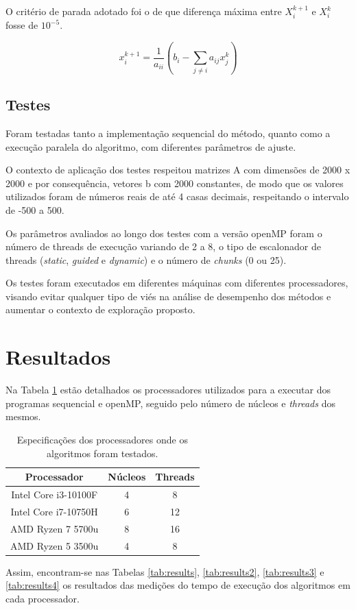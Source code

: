 \documentclass{article}
\begin{document}
O critério de parada adotado foi o de que diferença máxima entre $X_{i}^{k+1}$ e $X_{i}^{k}$ fosse de $10^{-5}$.

\begin{equation}
\label{eq:jacobi}
    x_{i}^{k+1} = \frac{1}{a_{ii}}\left(b_i - \sum_{j \neq i} a_{ij}x_{j}^{k}\right)
\end{equation}

\subsection{Testes}


Foram testadas tanto a implementação sequencial do método, quanto como a execução paralela do algoritmo, com diferentes parâmetros de ajuste. 

O contexto de aplicação dos testes respeitou matrizes A com dimensões de 2000 x 2000 e por consequência, vetores b com 2000 constantes, de modo que os valores utilizados foram de números reais de até 4 casas decimais, respeitando o intervalo de -500 a 500. 

Os parâmetros avaliados ao longo dos testes com a versão openMP foram o número de threads de execução variando de 2 a 8, o tipo de escalonador de threads (\textit{static}, \textit{guided} e \textit{dynamic})  e o número de \textit{chunks} (0 ou 25).  

Os testes foram executados em diferentes máquinas com diferentes processadores, visando evitar qualquer tipo de viés na análise de desempenho dos métodos e aumentar o contexto de exploração proposto. 


\section{Resultados}
Na Tabela \ref{tab:processor_specs} estão detalhados os processadores utilizados para a executar dos programas sequencial e openMP, seguido pelo número de núcleos e \textit{threads} dos mesmos.


\begin{table}[h]
    \centering
    \caption{Especificações dos processadores onde os algoritmos foram testados.}
    \label{tab:processor_specs}
    \begin{tabular}{ccc}
    \toprule
    \textbf{Processador} & \textbf{Núcleos} & \textbf{Threads} \\
    \midrule
    Intel Core i3-10100F & 4 & 8 \\
    Intel Core i7-10750H & 6 & 12 \\
    AMD Ryzen 7 5700u & 8 & 16 \\
    AMD Ryzen 5 3500u & 4 & 8 \\
    \bottomrule
    \end{tabular}
\end{table}
Assim, encontram-se nas Tabelas  \ref{tab:results}, \ref{tab:results2}, \ref{tab:results3} e \ref{tab:results4} os resultados das medições do tempo de execução dos algoritmos em cada processador. 
\end{document}
